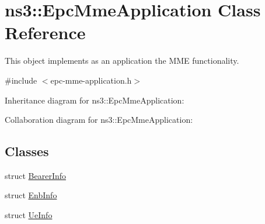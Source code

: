 \hypertarget{classns3_1_1EpcMmeApplication}{}\section{ns3\+:\+:Epc\+Mme\+Application Class Reference}
\label{classns3_1_1EpcMmeApplication}


This object implements as an application the M\+ME functionality.  




{\ttfamily \#include $<$epc-\/mme-\/application.\+h$>$}



Inheritance diagram for ns3\+:\+:Epc\+Mme\+Application\+:


Collaboration diagram for ns3\+:\+:Epc\+Mme\+Application\+:
\subsection*{Classes}
\begin{DoxyCompactItemize}
\item 
struct \hyperlink{structns3_1_1EpcMmeApplication_1_1BearerInfo}{Bearer\+Info}
\item 
struct \hyperlink{structns3_1_1EpcMmeApplication_1_1EnbInfo}{Enb\+Info}
\item 
struct \hyperlink{structns3_1_1EpcMmeApplication_1_1UeInfo}{Ue\+Info}
\end{DoxyCompactItemize}
